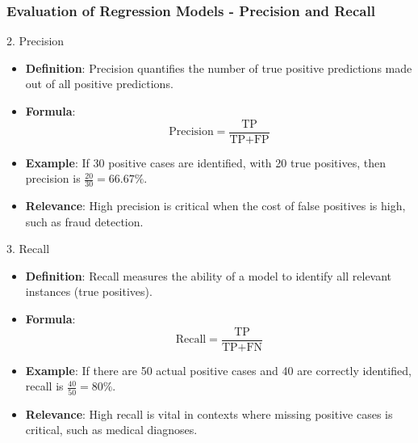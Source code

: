 \documentclass[aspectratio=169]{beamer}
\begin{document}
\begin{frame}[fragile]
    \frametitle{Evaluation of Regression Models - Precision and Recall}
    \begin{block}{2. Precision}
        \begin{itemize}
            \item \textbf{Definition}: Precision quantifies the number of true positive predictions made out of all positive predictions.
            \item \textbf{Formula}:
            \begin{equation}
            \text{Precision} = \frac{\text{TP}}{\text{TP} + \text{FP}}
            \end{equation}
            \item \textbf{Example}: If 30 positive cases are identified, with 20 true positives, then precision is \( \frac{20}{30} = 66.67\%\).
            \item \textbf{Relevance}: High precision is critical when the cost of false positives is high, such as fraud detection.
        \end{itemize}
    \end{block}

    \begin{block}{3. Recall}
        \begin{itemize}
            \item \textbf{Definition}: Recall measures the ability of a model to identify all relevant instances (true positives).
            \item \textbf{Formula}:
            \begin{equation}
            \text{Recall} = \frac{\text{TP}}{\text{TP} + \text{FN}}
            \end{equation}
            \item \textbf{Example}: If there are 50 actual positive cases and 40 are correctly identified, recall is \( \frac{40}{50} = 80\%\).
            \item \textbf{Relevance}: High recall is vital in contexts where missing positive cases is critical, such as medical diagnoses.
        \end{itemize}
    \end{block}
\end{frame}
\end{document}

